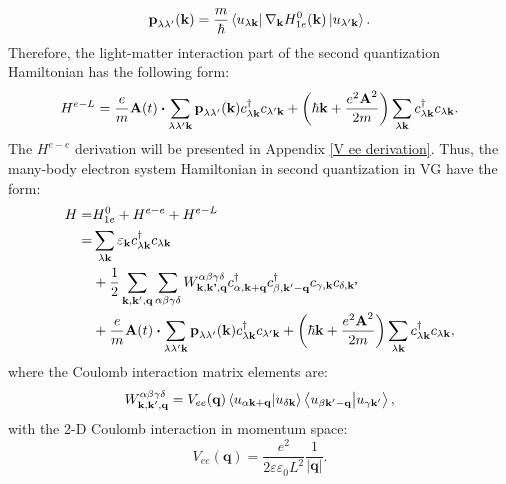 \documentclass[12pt,english,a4paper]{article}
\newcommand{\dg}{\dagger}
\begin{document}
	\begin{equation}
		\label{momentum}
		\textbf{p}_{\lambda\lambda'}(\textbf{k}) = \frac{m}{\hbar} \bra{u_{\lambda \textbf{k}}} \nabla_{\textbf{k}}H^0_{1e}(\textbf{k}) \ket{u_{\lambda'\textbf{k}}}.
	\end{equation}
	\quad Therefore, the light-matter interaction part of the second quantization Hamiltonian has the following form:
	\begin{equation}
		H^{e-L} = \frac{e}{m}\textbf{A}(t)\vdot\sum_{\lambda\lambda' \textbf{k}}\textbf{p}_{\lambda \lambda'}(\textbf{k})c^\dg_{\lambda\textbf{k}}c_{\lambda' \textbf{k}} + \bigg(\hbar \textbf{k} + \frac{e^2 \textbf{A}^2}{2m}\bigg)\sum_{\lambda \textbf{k}} c^\dg_{\lambda \textbf{k}} c_{\lambda\textbf{k}}.
	\end{equation}
	\quad The $H^{e-e}$ derivation will be presented in Appendix \ref{V ee derivation}. Thus, the many-body electron system Hamiltonian in second quantization in VG have the form:
		\begin{align}
		\label{H with Coulomb in second}
		H =& H^0_{1e} +H^{e-e} + H^{e-L} \nonumber \\
		=&  \sum_{\lambda\textbf{k}} \varepsilon_\textbf{k} c_{\lambda\textbf{k}}^\dg c_{\lambda\textbf{k}} \nonumber \\ 
		&+ \frac{1}{2} \sum_{\textbf{k}, \textbf{k}', \textbf{q}} \sum_{\alpha \beta \gamma \delta} W^{\alpha \beta \gamma \delta}_{\textbf{k},\textbf{k'},\textbf{q}} c_{\alpha, \textbf{k}+\textbf{q}}^\dg c_{\beta, \textbf{k}' - \textbf{q}}^\dg c_{\gamma, \textbf{k}}c_{\delta, \textbf{k'}} \nonumber \\
		&+ \frac{e}{m}\textbf{A}(t)\vdot\sum_{\lambda\lambda' \textbf{k}}\textbf{p}_{\lambda \lambda'}(\textbf{k})c^\dg_{\lambda\textbf{k}}c_{\lambda' \textbf{k}} + \bigg(\hbar \textbf{k} + \frac{e^2 \textbf{A}^2}{2m}\bigg)\sum_{\lambda \textbf{k}} c^\dg_{\lambda \textbf{k}} c_{\lambda\textbf{k}},
	\end{align}
	\quad where the Coulomb interaction matrix elements are:
	\begin{equation}
		W^{\alpha \beta \gamma \delta}_{\textbf{k}, \textbf{k}',\textbf{q}} = V_{ee}(\textbf{q}) \braket{u_{\alpha\textbf{k} +\textbf{q}}}{u_{\delta\textbf{k}}} \braket{u_{\beta\textbf{k}' -\textbf{q}}}{u_{\gamma \textbf{k}'}},
	\end{equation}
	\quad with the 2-D Coulomb interaction in momentum space:
	\begin{equation}
		\label{2D coulomb}
		V_{ee}(\textbf{q}) = \frac{e^2}{2\varepsilon\varepsilon_0 L^2} \frac{1}{|\textbf{q}|}.
	\end{equation}
\end{document}
